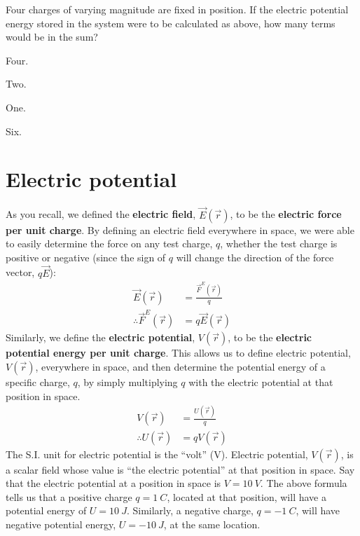 \begin{checkpoint}
	\begin{MCquestion}{Four charges of varying magnitude are fixed in position. If the electric potential energy stored in the system were to be calculated as above, how many terms would be in the sum?}
		\item Four.
		\item Two.
		\item One.
		\item Six. \correct
	\end{MCquestion}
\end{checkpoint}


\section{Electric potential}
As you recall, we defined the \textbf{electric field}, $\vec E(\vec r)$, to be the \textbf{electric force per unit charge}. By defining an electric field everywhere in space, we were able to easily determine the force on any test charge, $q$, whether the test charge is positive or negative (since the sign of $q$ will change the direction of the force vector, $q\vec E$):
\begin{align*}
\vec E(\vec r) &= \frac{\vec F^E(\vec r)}{q}\\
\therefore \vec F^E(\vec r)&=q\vec E(\vec r)
\end{align*}
Similarly, we define the \textbf{electric potential}, $V(\vec r)$, to be the \textbf{electric potential energy per unit charge}. This allows us to define electric potential, $V(\vec r)$, everywhere in space, and then determine the potential energy of a specific charge, $q$, by simply multiplying $q$ with the electric potential at that position in space.
\begin{align*}
V(\vec r) &= \frac{ U(\vec r)}{q}\\
\therefore U(\vec r)&= q V(\vec r)
\end{align*}
The S.I. unit for electric potential is the ``volt'' (V). Electric potential, $V(\vec r)$, is a scalar field whose value is ``the electric potential'' at that position in space. Say that the electric potential at a position in space is  $V=\SI{10}{V}$. The above formula tells us that a positive charge $q=\SI{1}{C}$, located at that position, will have a potential energy of $U=\SI{10}{J}$. Similarly, a negative charge, $q=\SI{-1}{C}$, will have negative potential energy, $U=\SI{-10}{J}$, at the same location.

